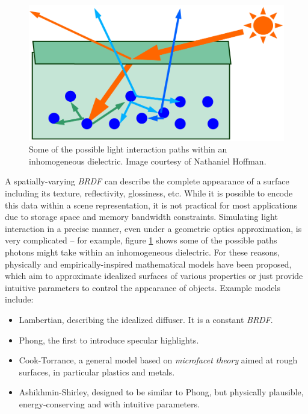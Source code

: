 \begin{figure}[h!]
  \centering
    \includegraphics[width=0.4\linewidth]{./Chapters/InhomogeneousDielectric.png}
    \caption[Inhomogeneous dielectric]{Some of the possible light interaction paths within an inhomogeneous dielectric. Image courtesy of Nathaniel Hoffman.}
  \label{fig:InhomogeneousDielectric}
\end{figure}

A spatially-varying \emph{BRDF} can describe the complete appearance of a surface including its texture, reflectivity, glossiness, etc. While it is possible to encode this data within a scene representation, it is not practical for most applications due to storage space and memory bandwidth constraints. Simulating light interaction in a precise manner, even under a geometric optics approximation, is very complicated -- for example, figure \ref{fig:InhomogeneousDielectric} shows some of the possible paths photons might take within an inhomogeneous dielectric. For these reasons, physically and empirically-inspired mathematical models have been proposed, which aim to approximate idealized surfaces of various properties or just provide intuitive parameters to control the appearance of objects. Example models include:
\begin{itemize}
\item Lambertian, describing the idealized diffuser. It is a constant \emph{BRDF}.
\item Phong, the first to introduce specular highlights.
\item Cook-Torrance, a general model based on \emph{microfacet theory} aimed at rough surfaces, in particular plastics and metals.
\item Ashikhmin-Shirley, designed to be similar to Phong, but physically plausible, energy-conserving and with intuitive parameters.
\end{itemize}

